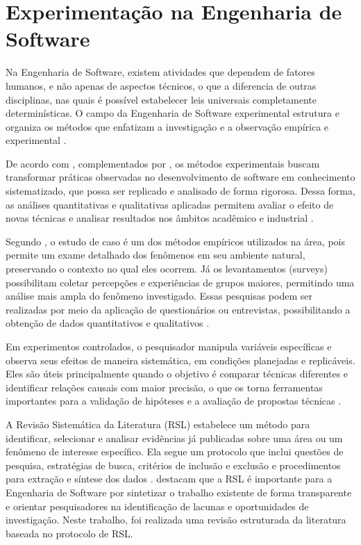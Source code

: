 \section{Experimentação na Engenharia de Software}
\label{subsec:experimentacao}


Na Engenharia de Software, existem atividades que dependem de fatores humanos, e não apenas de aspectos técnicos, o que a diferencia de outras disciplinas, nas quais é possível estabelecer leis universais completamente determinísticas. O campo da Engenharia de Software experimental estrutura e organiza os métodos que enfatizam a investigação e a observação empírica e experimental \cite{Wohlin:2012:ESE:2349018}.

De acordo com , complementados por , os métodos experimentais buscam transformar práticas observadas no desenvolvimento de software em conhecimento sistematizado, que possa ser replicado e analisado de forma rigorosa. Dessa forma, as análises quantitativas e qualitativas aplicadas permitem avaliar o efeito de novas técnicas e analisar resultados nos âmbitos acadêmico e industrial \cite{Basili1994,Wohlin:2012:ESE:2349018}.

Segundo , o estudo de caso é um dos métodos empíricos utilizados na área, pois permite um exame detalhado dos fenômenos em seu ambiente natural, preservando o contexto no qual eles ocorrem. Já os levantamentos (surveys) possibilitam coletar percepções e experiências de grupos maiores, permitindo uma análise mais ampla do fenômeno investigado. Essas pesquisas podem ser realizadas por meio da aplicação de questionários ou entrevistas, possibilitando a obtenção de dados quantitativos e qualitativos \cite{Wohlin:2012:ESE:2349018}.

Em experimentos controlados, o pesquisador manipula variáveis específicas e observa seus efeitos de maneira sistemática, em condições planejadas e replicáveis. Eles são úteis principalmente quando o objetivo é comparar técnicas diferentes e identificar relações causais com maior precisão, o que os torna ferramentas importantes para a validação de hipóteses e a avaliação de propostas técnicas \cite{Wohlin:2012:ESE:2349018}.

A Revisão Sistemática da Literatura (RSL) estabelece um método para identificar, selecionar e analisar evidências já publicadas sobre uma área ou um fenômeno de interesse específico. Ela segue um protocolo que inclui questões de pesquisa, estratégias de busca, critérios de inclusão e exclusão e procedimentos para extração e síntese dos dados \cite{kitchenham2007guidelines}.  destacam que a RSL é importante para a Engenharia de Software por sintetizar o trabalho existente de forma transparente e orientar pesquisadores na identificação de lacunas e oportunidades de investigação. Neste trabalho, foi realizada uma revisão estruturada da literatura baseada no protocolo de RSL.


